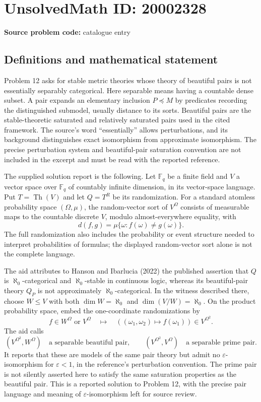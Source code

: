 \documentclass[11pt]{article}
\newcommand{\F}{\mathbb{F}}
\begin{document}
\section*{UnsolvedMath ID: 20002328}
\textbf{Source problem code:} catalogue entry
\subsection{Definitions and mathematical statement}
Problem 12 asks for stable metric theories whose theory of beautiful pairs is not essentially separably categorical. Here separable means having a countable dense subset. A pair expands an elementary inclusion \(P\preccurlyeq M\) by predicates recording the distinguished submodel, usually distance to its sorts. Beautiful pairs are the stable-theoretic saturated and relatively saturated pairs used in the cited framework. The source's word ``essentially'' allows perturbations, and its background distinguishes exact isomorphism from approximate isomorphism. The precise perturbation system and beautiful-pair saturation convention are not included in the excerpt and must be read with the reported reference.

The supplied solution report is the following. Let \(\F_q\) be a finite field and \(V\) a vector space over \(\F_q\) of countably infinite dimension, in its vector-space language. Put \(T=\operatorname{Th}(V)\) and let \(Q=T^R\) be its randomization. For a standard atomless probability space \((\Omega,\mu)\), the random-vector sort of \(V^\Omega\) consists of measurable maps to the countable discrete \(V\), modulo almost-everywhere equality, with
\[
 d(f,g)=\mu\{\omega:f(\omega)\ne g(\omega)\}.
\]
The full randomization also includes the probability or event structure needed to interpret probabilities of formulas; the displayed random-vector sort alone is not the complete language.

The aid attributes to Hanson and Ibarlucia (2022) the published assertion that \(Q\) is \(\aleph_0\)-categorical and \(\aleph_0\)-stable in continuous logic, whereas its beautiful-pair theory \(Q_P\) is not approximately \(\aleph_0\)-categorical. In the witness described there, choose \(W\le V\) with both \(\dim W=\aleph_0\) and \(\dim(V/W)=\aleph_0\). On the product probability space, embed the one-coordinate randomizations by
\[
 f\in W^\Omega\text{ or }V^\Omega
 \quad\longmapsto\quad((\omega_1,\omega_2)\mapsto f(\omega_1))\in V^{\Omega^2}.
\]
The aid calls
\[
 (V^{\Omega^2},W^\Omega)\quad\text{a separable beautiful pair},\qquad
 (V^{\Omega^2},V^\Omega)\quad\text{a separable prime pair}.
\]
It reports that these are models of the same pair theory but admit no \(\varepsilon\)-isomorphism for \(\varepsilon<1\), in the reference's perturbation convention. The prime pair is not silently asserted here to satisfy the same saturation properties as the beautiful pair. This is a reported solution to Problem 12, with the precise pair language and meaning of \(\varepsilon\)-isomorphism left for source review.
\end{document}
